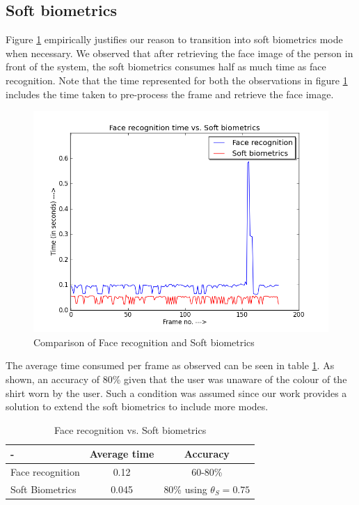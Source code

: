 \documentclass[%
        final,
        internal,
        notitlepage,
        narroweqnarray,
        inline,
        ]{ieee}
\begin{document}
\subsection{Soft biometrics}
Figure \ref{fig:fsoft} empirically justifies our reason to transition into soft biometrics mode when necessary.
We observed that after retrieving the face image of the person in front of the system, the soft biometrics consumes half as much time as face recognition.
Note that the time represented for both the observations in figure \ref{fig:fsoft} includes the time taken to pre-process the frame and retrieve the face image.
\begin{figure}[h!]
	\centering
	\includegraphics[scale=0.40]{img/face_vs_soft.png}
	\caption{Comparison of Face recognition and Soft biometrics}
	\label{fig:fsoft}
\end{figure}
The average time consumed per frame as observed can be seen in table \ref{tab:frsb}.
As shown, an accuracy of 80\% given that the user was unaware of the colour of the shirt worn by the user.
Such a condition was assumed since our work provides a solution to extend the soft biometrics to include more modes.
\begin{table}[htp]
	\centering
	\caption{Face recognition vs. Soft biometrics}
	\begin{tabular}{||l|c|c||} \hline \hline
	-                  &  Average time  &  Accuracy \\ \hline
	Face recognition   &  0.12          &  60-80\% \\ \hline
	Soft Biometrics    &  0.045         &  80\% using $\theta_{S}=0.75$ \\ \hline \hline
	\end{tabular}
	\label{tab:frsb}
\end{table}
\end{document}
